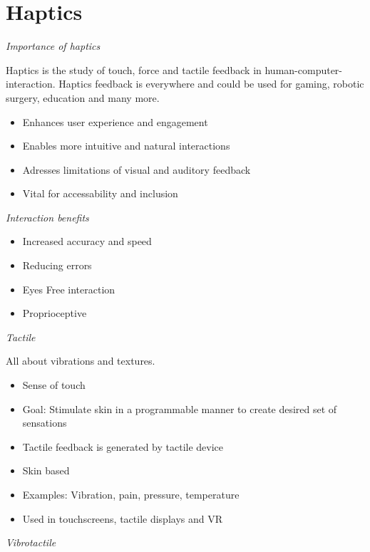 \section{Haptics}

\textit{Importance of haptics} \smallbreak

Haptics is the study of touch, force and tactile feedback in human-computer-interaction. 
Haptics feedback is everywhere and could be used for gaming, robotic surgery, education and many more. 

\begin{itemize}[itemsep=-5pt, topsep=0pt, leftmargin=*]
	\item Enhances user experience and engagement
	\item Enables more intuitive and natural interactions
	\item Adresses limitations of visual and auditory feedback
	\item Vital for accessability and inclusion
\end{itemize}\medskip



\textit{Interaction benefits}  \smallskip
\begin{itemize}[itemsep=-5pt, topsep=0pt, leftmargin=*]
	\item Increased accuracy and speed
	\item Reducing errors
	\item Eyes Free interaction
	\item Proprioceptive
\end{itemize} \medskip

\textit{Tactile} \smallskip

All about vibrations and textures.

\begin{itemize}[itemsep=-5pt, topsep=0pt, leftmargin=*]
	\item Sense of touch
	\item Goal: Stimulate skin in a programmable manner to create desired set of sensations
	\item Tactile feedback is generated by tactile device
	\item Skin based
	\item Examples: Vibration, pain, pressure, temperature
	\item Used in touchscreens, tactile displays and VR
\end{itemize}


\textit{Vibrotactile} \smallskip

